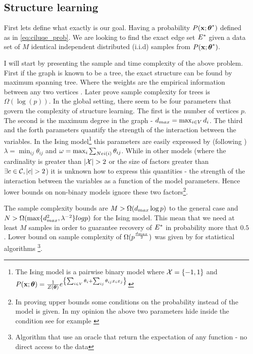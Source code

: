 \subsection{Structure learning}
First lets define what exactly is our goal.
Having a probability $P({\bf x};{\boldsymbol{\theta}}^{*})$ defined as in \eqref{eq:ciluqe_prob}.
We are looking to find the exact edge set ${E}^{*}$ given a data set of $M$ identical independent distributed (i.i.d) samples from $P({\bf x};{\boldsymbol{\theta}}^{*})$.

I will start by presenting the sample and time complexity of the above problem. 
First if the graph is known to be a tree, the exact structure can be found by maximum spanning tree.  Where the  weights are the empirical information between any two vertices \cite{chowLiu}. 
Later \cite{tan2011learning} prove sample complexity for trees is $\Omega(\log(p))$.
In the global setting, there seem to be four parameters that govern the complexity of structure learning.
The first is  the number of vertices $p$.
The second is the maximum degree in the graph - $d_{max} = \max_{i \in V} d_i$.
The third and the forth parameters quantify the strength of the interaction between the variables.
In the Ising model\footnote{ The Ising model is a pairwise binary model where ${\cal X} = \{-1,1\}$ and $P({\bf x};\boldsymbol{\theta}) = \frac{1}{Z(\boldsymbol{\theta})} e^{\left\{\sum_{i \in V}\theta_i + \sum_{ij}\theta_{ij}x_ix_j\right\}}$} this parameters are easily expressed by (following \cite{santhanam2012information}) $\lambda = \min_{ij} \theta_{ij}$ and $\omega = \max_i \sum_{Nei(i)} \theta_{ij}$.
While in other models (where the cardinality is greater than $|\cX|>2$ or the size of factors greater than $\exists c \in \cC, |c|>2$) it is unknown how to express this quantities - the strength of the interaction between the variables as a function of the model parameters.
Hence lower bounds  on non-binary models ignore these two factors\footnote{In proving upper bounds some conditions on the probability instead of the model is given. In my opinion the above two parameters hide inside the condition see for example \cite{bresler2008reconstruction}}.

The sample complexity bounds are $M > \Omega(d_{max} \log p)$ to the general case and $N > \Omega(\max\{d_{max}^2, \lambda^{-2}\}log p) $ for the Ising model.
This mean that we need at least $M$ samples in order to guarantee recovery of ${E}^{*}$ in probability more that $0.5$.
Lower bound on sample complexity of $\Omega(p^{\frac{d_{max}}{2}})$ was given by \cite{bresler2014structure} for statistical algorithms \cite{feldman2013statistical}\footnote{Algorithm that use an oracle that return the expectation of any function - no direct access to the data}.

